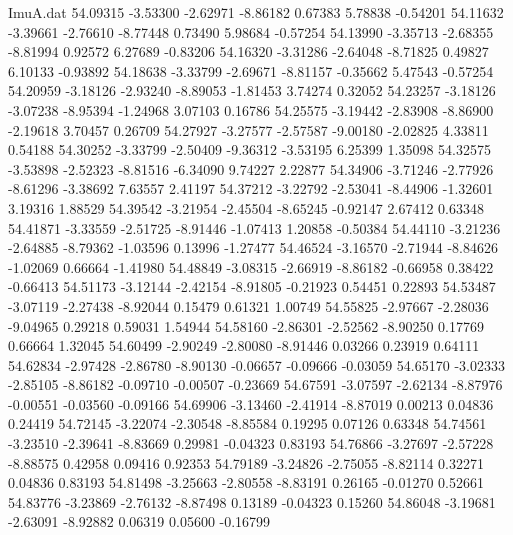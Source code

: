 \begin{filecontents}{ImuA.dat}
  54.09315   -3.53300   -2.62971   -8.86182    0.67383    5.78838   -0.54201
  54.11632   -3.39661   -2.76610   -8.77448    0.73490    5.98684   -0.57254
  54.13990   -3.35713   -2.68355   -8.81994    0.92572    6.27689   -0.83206
  54.16320   -3.31286   -2.64048   -8.71825    0.49827    6.10133   -0.93892
  54.18638   -3.33799   -2.69671   -8.81157   -0.35662    5.47543   -0.57254
  54.20959   -3.18126   -2.93240   -8.89053   -1.81453    3.74274    0.32052
  54.23257   -3.18126   -3.07238   -8.95394   -1.24968    3.07103    0.16786
  54.25575   -3.19442   -2.83908   -8.86900   -2.19618    3.70457    0.26709
  54.27927   -3.27577   -2.57587   -9.00180   -2.02825    4.33811    0.54188
  54.30252   -3.33799   -2.50409   -9.36312   -3.53195    6.25399    1.35098
  54.32575   -3.53898   -2.52323   -8.81516   -6.34090    9.74227    2.22877
  54.34906   -3.71246   -2.77926   -8.61296   -3.38692    7.63557    2.41197
  54.37212   -3.22792   -2.53041   -8.44906   -1.32601    3.19316    1.88529
  54.39542   -3.21954   -2.45504   -8.65245   -0.92147    2.67412    0.63348
  54.41871   -3.33559   -2.51725   -8.91446   -1.07413    1.20858   -0.50384
  54.44110   -3.21236   -2.64885   -8.79362   -1.03596    0.13996   -1.27477
  54.46524   -3.16570   -2.71944   -8.84626   -1.02069    0.66664   -1.41980
  54.48849   -3.08315   -2.66919   -8.86182   -0.66958    0.38422   -0.66413
  54.51173   -3.12144   -2.42154   -8.91805   -0.21923    0.54451    0.22893
  54.53487   -3.07119   -2.27438   -8.92044    0.15479    0.61321    1.00749
  54.55825   -2.97667   -2.28036   -9.04965    0.29218    0.59031    1.54944
  54.58160   -2.86301   -2.52562   -8.90250    0.17769    0.66664    1.32045
  54.60499   -2.90249   -2.80080   -8.91446    0.03266    0.23919    0.64111
  54.62834   -2.97428   -2.86780   -8.90130   -0.06657   -0.09666   -0.03059
  54.65170   -3.02333   -2.85105   -8.86182   -0.09710   -0.00507   -0.23669
  54.67591   -3.07597   -2.62134   -8.87976   -0.00551   -0.03560   -0.09166
  54.69906   -3.13460   -2.41914   -8.87019    0.00213    0.04836    0.24419
  54.72145   -3.22074   -2.30548   -8.85584    0.19295    0.07126    0.63348
  54.74561   -3.23510   -2.39641   -8.83669    0.29981   -0.04323    0.83193
  54.76866   -3.27697   -2.57228   -8.88575    0.42958    0.09416    0.92353
  54.79189   -3.24826   -2.75055   -8.82114    0.32271    0.04836    0.83193
  54.81498   -3.25663   -2.80558   -8.83191    0.26165   -0.01270    0.52661
  54.83776   -3.23869   -2.76132   -8.87498    0.13189   -0.04323    0.15260
  54.86048   -3.19681   -2.63091   -8.92882    0.06319    0.05600   -0.16799

\end{filecontents}
